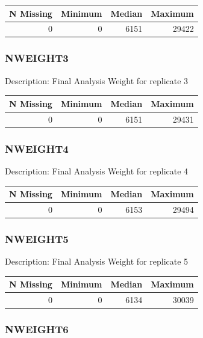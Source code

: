 \documentclass[
]{krantz}
\begin{document}
\begin{tabular}[t]{r|r|r|r}
\hline
N Missing & Minimum & Median & Maximum\\
\hline
0 & 0 & 6151 & 29422\\
\hline
\end{tabular}

\hypertarget{nweight3}{%
\subsubsection*{NWEIGHT3}\label{nweight3}}


Description: Final Analysis Weight for replicate 3

\begin{tabular}[t]{r|r|r|r}
\hline
N Missing & Minimum & Median & Maximum\\
\hline
0 & 0 & 6151 & 29431\\
\hline
\end{tabular}

\hypertarget{nweight4}{%
\subsubsection*{NWEIGHT4}\label{nweight4}}


Description: Final Analysis Weight for replicate 4

\begin{tabular}[t]{r|r|r|r}
\hline
N Missing & Minimum & Median & Maximum\\
\hline
0 & 0 & 6153 & 29494\\
\hline
\end{tabular}

\hypertarget{nweight5}{%
\subsubsection*{NWEIGHT5}\label{nweight5}}


Description: Final Analysis Weight for replicate 5

\begin{tabular}[t]{r|r|r|r}
\hline
N Missing & Minimum & Median & Maximum\\
\hline
0 & 0 & 6134 & 30039\\
\hline
\end{tabular}

\hypertarget{nweight6}{%
\subsubsection*{NWEIGHT6}\label{nweight6}}
\end{document}
